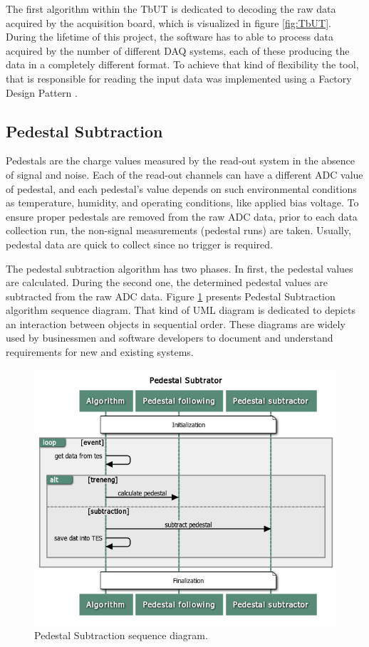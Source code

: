 The first algorithm within the TbUT is dedicated to decoding the raw data acquired by the acquisition board, which is visualized in figure \ref{fig:TbUT}.  
During the lifetime of this project, the software has to able to process data acquired by the number of different DAQ systems, each of these producing the data in a completely different format.  To achieve that kind of flexibility the tool, that is responsible for reading the input data was implemented using a Factory Design Pattern \cite{DesignPatterns}. 

\subsection{Pedestal Subtraction}

Pedestals are the charge values measured by the read-out system in the absence of signal and noise. Each of the read-out channels can have a different ADC value of pedestal, and each pedestal's value depends on such environmental conditions as temperature, humidity, and operating conditions, like applied bias voltage. 
To ensure proper pedestals are removed from the raw ADC data, prior to each data collection run, the non-signal measurements (pedestal runs) are taken. Usually, pedestal data are quick to collect since no trigger is required. 

The pedestal subtraction algorithm has two phases. In first, the pedestal values are calculated. During the second one, the determined pedestal values are subtracted from the raw ADC data. Figure \ref{fig:ped} presents Pedestal Subtraction algorithm sequence diagram. That kind of UML diagram \cite{UML} is dedicated to depicts an interaction between objects in sequential order. These diagrams are widely used by businessmen and software developers to document and understand requirements for new and existing systems. 

\begin{figure}
\centering
\includegraphics[scale=0.6]{figures/Pedestal_Subtrator.png}
\caption{Pedestal Subtraction sequence diagram.}
\label{fig:ped}
\end{figure}



